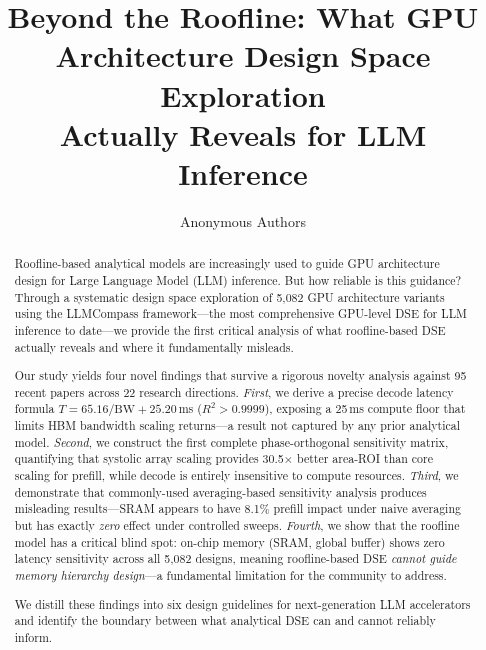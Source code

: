 \documentclass[sigconf,10pt]{acmart}
\begin{document}
\title{Beyond the Roofline: What GPU Architecture Design Space Exploration\\
Actually Reveals for LLM Inference}

\author{Anonymous Authors}

\begin{abstract}
Roofline-based analytical models are increasingly used to guide GPU
architecture design for Large Language Model (LLM) inference. But how
reliable is this guidance? Through a systematic design space exploration
of 5,082 GPU architecture variants using the LLMCompass framework---the
most comprehensive GPU-level DSE for LLM inference to date---we provide
the first critical analysis of what roofline-based DSE actually reveals
and where it fundamentally misleads.

Our study yields four novel findings that survive a rigorous novelty
analysis against 95 recent papers across 22 research directions.
\emph{First}, we derive a precise decode latency formula
$T = 65.16/\text{BW} + 25.20$\,ms ($R^2 > 0.9999$), exposing a 25\,ms
compute floor that limits HBM bandwidth scaling returns---a result not
captured by any prior analytical model. \emph{Second}, we construct the
first complete phase-orthogonal sensitivity matrix, quantifying that
systolic array scaling provides 30.5$\times$ better area-ROI than core
scaling for prefill, while decode is entirely insensitive to compute
resources. \emph{Third}, we demonstrate that commonly-used averaging-based
sensitivity analysis produces misleading results---SRAM appears to have
8.1\% prefill impact under naive averaging but has exactly \emph{zero}
effect under controlled sweeps. \emph{Fourth}, we show that the roofline
model has a critical blind spot: on-chip memory (SRAM, global buffer)
shows zero latency sensitivity across all 5,082 designs, meaning
roofline-based DSE \emph{cannot guide memory hierarchy design}---a
fundamental limitation for the community to address.

We distill these findings into six design guidelines for next-generation
LLM accelerators and identify the boundary between what analytical DSE
can and cannot reliably inform.
\end{abstract}


\maketitle
\end{document}
